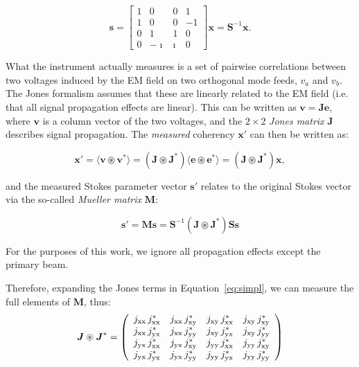 \begin{equation}  \label{eq:mconversion}
\bm{s} = \left[ \begin{array}{cccc}
                         1 & 0 & 0 & 1 \\
                         1 & 0 & 0 & -1 \\
                         0 & 1 & 1 & 0 \\
                         0 & -\imath & \imath & 0
                         \end{array} \right] \bm{x} = \bm{S}^{-1} \bm{x}.
\end{equation}

What the instrument actually measures is a set of pairwise correlations between two voltages induced by the EM field on two orthogonal mode feeds, $v_a$ and $v_b$. 
The Jones formalism assumes that these are linearly related to the EM field (i.e. that all signal propagation effects are linear). 
This can be written as $\bm{v}=\bm{J} \bm{e}$, where $\bm{v}$ is a column vector of the two voltages, and the $2\times 2$ \emph{Jones matrix} $\bm{J}$ 
describes signal propagation. The \emph{measured} coherency $\bm{x}'$ can then be written as:

\begin{equation}
\bm{x}' = \langle \bm{v} \circledast \bm{v}^* \rangle = (\bm{J} \circledast \bm{J}^* ) \langle \bm{e} \circledast \bm{e}^* \rangle =
(\bm{J} \circledast \bm{J}^* ) \bm{x},
\end{equation}

\noindent and the measured Stokes parameter vector $\bm{s}'$ relates to the original Stokes vector via the so-called \emph{Mueller matrix} $\bm{M}$:

\begin{equation} \label{eq:simpl}
\bm{s}' = \bm{M} \bm{s} = \bm{S}^{-1} (\bm{J} \circledast \bm{J}^* ) \bm{S} \bm{s}
\end{equation}

\noindent For the purposes of this work, we ignore all propagation effects except the primary beam. 
   
\noindent Therefore, expanding the Jones terms in Equation~\ref{eq:simpl}, we can measure the full elements of $\bm{M}$, thus:
\begin{eqnarray} \boldsymbol{J} \circledast \boldsymbol{J}^* = \left( \begin{array}{cccc}
                         j_{\rm xx}\,j_{\rm xx}^* & j_{\rm xx}\,j_{\rm xy}^* & j_{\rm xy}\,j_{\rm xx}^* & j_{\rm xy}\,j_{\rm xy}^* \\
                         j_{\rm xx}\,j_{\rm yx}^* & j_{\rm xx}\,j_{\rm yy}^*  & j_{\rm xy}\,j_{\rm yx}^* & j_{\rm xy}\,j_{\rm yy}^* \\
                         j_{\rm yx}\,j_{\rm xx}^* & j_{\rm yx}\,j_{\rm xy}^* & j_{\rm yy}\,j_{\rm xx}^* & j_{\rm yy}\,j_{\rm xy}^* \\
                         j_{\rm yx}\,j_{\rm yx}^* & j_{\rm yx}\,j_{\rm yy}^* & j_{\rm yy}\,j_{\rm yx}^* & j_{\rm yy}\,j_{\rm yy}^*
                         \end{array} \right) \label{eq:fr19} \end{eqnarray}
                         
